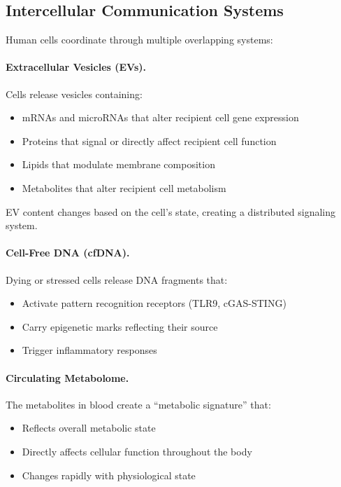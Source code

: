 \subsection{Intercellular Communication Systems}

Human cells coordinate through multiple overlapping systems:

\paragraph{Extracellular Vesicles (EVs).} Cells release vesicles containing:
\begin{itemize}
    \item mRNAs and microRNAs that alter recipient cell gene expression
    \item Proteins that signal or directly affect recipient cell function
    \item Lipids that modulate membrane composition
    \item Metabolites that alter recipient cell metabolism
\end{itemize}

EV content changes based on the cell's state, creating a distributed signaling system.

\paragraph{Cell-Free DNA (cfDNA).} Dying or stressed cells release DNA fragments that:
\begin{itemize}
    \item Activate pattern recognition receptors (TLR9, cGAS-STING)
    \item Carry epigenetic marks reflecting their source
    \item Trigger inflammatory responses
\end{itemize}

\paragraph{Circulating Metabolome.} The metabolites in blood create a ``metabolic signature'' that:
\begin{itemize}
    \item Reflects overall metabolic state
    \item Directly affects cellular function throughout the body
    \item Changes rapidly with physiological state
\end{itemize}

